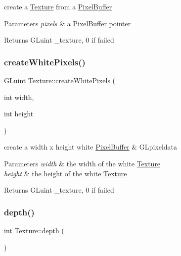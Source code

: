 create a \hyperlink{class_texture}{Texture} from a \hyperlink{struct_pixel_buffer}{Pixel\+Buffer} 


\begin{DoxyParams}{Parameters}
{\em pixels} & a \hyperlink{struct_pixel_buffer}{Pixel\+Buffer} pointer \\
\hline
\end{DoxyParams}
\begin{DoxyReturn}{Returns}
G\+Luint \+\_\+texture, 0 if failed 
\end{DoxyReturn}
\mbox{\label{class_texture_a4efabecf7657384b7b6cb4e6f1b8a62f}} 
\subsubsection{\texorpdfstring{create\+White\+Pixels()}{createWhitePixels()}}
{\footnotesize\ttfamily G\+Luint Texture\+::create\+White\+Pixels (\begin{DoxyParamCaption}\item[{int}]{width,  }\item[{int}]{height }\end{DoxyParamCaption})}



create a width x height white \hyperlink{struct_pixel_buffer}{Pixel\+Buffer} \& G\+Lpixeldata 


\begin{DoxyParams}{Parameters}
{\em width} & the width of the white \hyperlink{class_texture}{Texture} \\
\hline
{\em height} & the height of the white \hyperlink{class_texture}{Texture} \\
\hline
\end{DoxyParams}
\begin{DoxyReturn}{Returns}
G\+Luint \+\_\+texture, 0 if failed 
\end{DoxyReturn}
\mbox{\label{class_texture_a9e69c0d8b6e28dad8a9bb0ceb0af5da7}} 
\subsubsection{\texorpdfstring{depth()}{depth()}}
{\footnotesize\ttfamily int Texture\+::depth (\begin{DoxyParamCaption}{ }\end{DoxyParamCaption})\hspace{0.3cm}{\ttfamily [inline]}}



